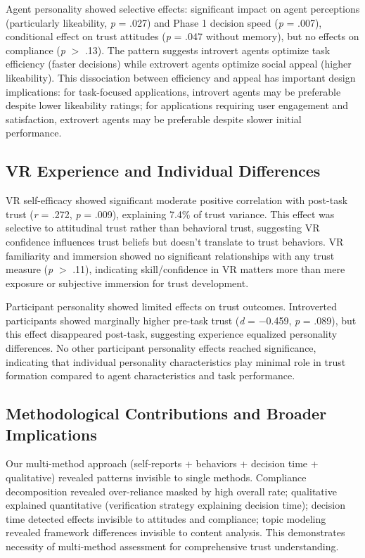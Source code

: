 \documentclass[12pt]{article}
\begin{document}
Agent personality showed selective effects: significant impact on agent perceptions (particularly likeability, \textit{p} = .027) and Phase 1 decision speed (\textit{p} = .007), conditional effect on trust attitudes (\textit{p} = .047 without memory), but no effects on compliance (\textit{p} $>$ .13). The pattern suggests introvert agents optimize task efficiency (faster decisions) while extrovert agents optimize social appeal (higher likeability). This dissociation between efficiency and appeal has important design implications: for task-focused applications, introvert agents may be preferable despite lower likeability ratings; for applications requiring user engagement and satisfaction, extrovert agents may be preferable despite slower initial performance.

\subsection{VR Experience and Individual Differences}

VR self-efficacy showed significant moderate positive correlation with post-task trust (\textit{r} = .272, \textit{p} = .009), explaining 7.4\% of trust variance. This effect was selective to attitudinal trust rather than behavioral trust, suggesting VR confidence influences trust beliefs but doesn't translate to trust behaviors. VR familiarity and immersion showed no significant relationships with any trust measure (\textit{p} $>$ .11), indicating skill/confidence in VR matters more than mere exposure or subjective immersion for trust development.

Participant personality showed limited effects on trust outcomes. Introverted participants showed marginally higher pre-task trust (\textit{d} = $-$0.459, \textit{p} = .089), but this effect disappeared post-task, suggesting experience equalized personality differences. No other participant personality effects reached significance, indicating that individual personality characteristics play minimal role in trust formation compared to agent characteristics and task performance.

\subsection{Methodological Contributions and Broader Implications}

Our multi-method approach (self-reports + behaviors + decision time + qualitative) revealed patterns invisible to single methods. Compliance decomposition revealed over-reliance masked by high overall rate; qualitative explained quantitative (verification strategy explaining decision time); decision time detected effects invisible to attitudes and compliance; topic modeling revealed framework differences invisible to content analysis. This demonstrates necessity of multi-method assessment for comprehensive trust understanding.
\end{document}
